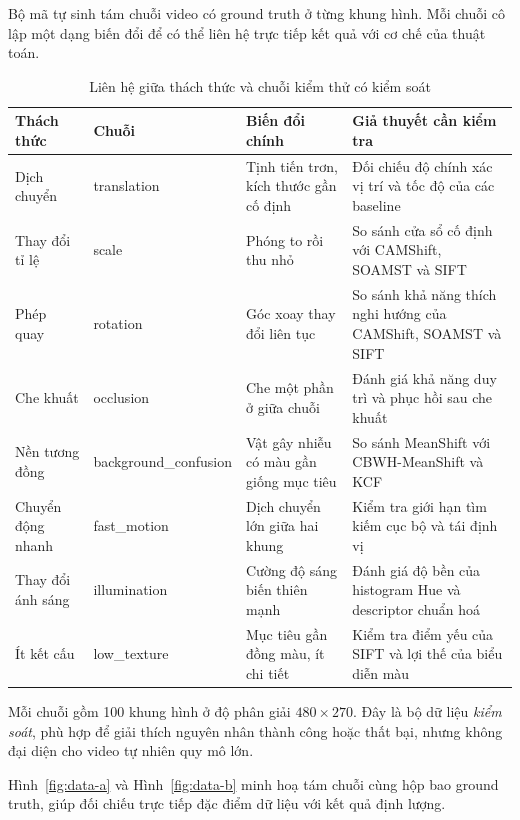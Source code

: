 \documentclass[12pt,a4paper]{article}
\numberwithin{equation}{section}
\begin{document}
Bộ mã tự sinh tám chuỗi video có ground truth ở từng khung hình. Mỗi chuỗi cô lập một dạng biến
đổi để có thể liên hệ trực tiếp kết quả với cơ chế của thuật toán.

\begin{table}[H]
\centering
\caption{Liên hệ giữa thách thức và chuỗi kiểm thử có kiểm soát}
\label{tab:synthetic-scenarios}
\scriptsize
\begin{tabular}{@{}>{\raggedright\arraybackslash}p{2.5cm}>{\ttfamily\raggedright\arraybackslash}p{4.1cm}>{\raggedright\arraybackslash}p{3.2cm}>{\raggedright\arraybackslash}p{4.3cm}@{}}
\toprule
\textbf{Thách thức} & \textnormal{\textbf{Chuỗi}} & \textbf{Biến đổi chính} & \textbf{Giả thuyết cần kiểm tra} \\
\midrule
Dịch chuyển & translation & Tịnh tiến trơn, kích thước gần cố định & Đối chiếu độ chính xác vị trí và tốc độ của các baseline \\
Thay đổi tỉ lệ & scale & Phóng to rồi thu nhỏ & So sánh cửa sổ cố định với CAMShift, SOAMST và SIFT \\
Phép quay & rotation & Góc xoay thay đổi liên tục & So sánh khả năng thích nghi hướng của CAMShift, SOAMST và SIFT \\
Che khuất & occlusion & Che một phần ở giữa chuỗi & Đánh giá khả năng duy trì và phục hồi sau che khuất \\
Nền tương đồng & background\_confusion & Vật gây nhiễu có màu gần giống mục tiêu & So sánh MeanShift với CBWH-MeanShift và KCF \\
Chuyển động nhanh & fast\_motion & Dịch chuyển lớn giữa hai khung & Kiểm tra giới hạn tìm kiếm cục bộ và tái định vị \\
Thay đổi ánh sáng & illumination & Cường độ sáng biến thiên mạnh & Đánh giá độ bền của histogram Hue và descriptor chuẩn hoá \\
Ít kết cấu & low\_texture & Mục tiêu gần đồng màu, ít chi tiết & Kiểm tra điểm yếu của SIFT và lợi thế của biểu diễn màu \\
\bottomrule
\end{tabular}
\end{table}

Mỗi chuỗi gồm 100 khung hình ở độ phân giải $480\times270$. Đây là bộ dữ liệu \textit{kiểm soát},
phù hợp để giải thích nguyên nhân thành công hoặc thất bại, nhưng không đại diện cho video tự nhiên
quy mô lớn.

Hình~\ref{fig:data-a} và Hình~\ref{fig:data-b} minh hoạ tám chuỗi cùng hộp bao ground truth, giúp
đối chiếu trực tiếp đặc điểm dữ liệu với kết quả định lượng.
\end{document}
